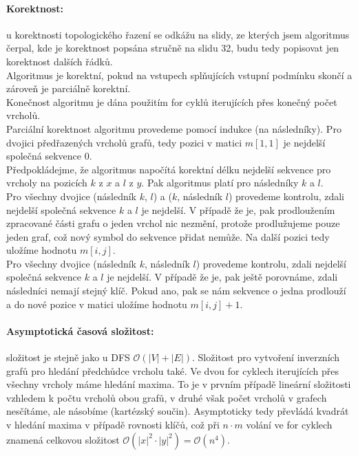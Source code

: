 \documentclass[12pt]{iv003}
\begin{document}
\paragraph{Korektnost:} u korektnosti topologického řazení se odkážu na slidy, ze kterých jsem algoritmus čerpal, kde je korektnost popsána stručně na slidu 32, budu tedy popisovat jen korektnost dalších řádků.\\
Algoritmus je korektní, pokud na vstupech splňujících vstupní podmínku skončí a zároveň je parciálně korektní.\\
Konečnost algoritmu je dána použitím for cyklů iterujících přes konečný počet vrcholů.\\
Parciální korektnost algoritmu provedeme pomocí indukce (na následníky). Pro dvojici předřazených vrcholů grafů, tedy pozici v matici $m[1,1]$ je nejdelší společná sekvence 0.\\
Předpokládejme, že algoritmus napočítá korektní délku nejdelší sekvence pro vrcholy na pozicích $k$ z $x$ a $l$ z $y$. Pak algoritmus platí pro následníky $k$ a $l$.\\
Pro všechny dvojice (následník $k$, $l$) a ($k$, následník $l$) provedeme kontrolu, zdali nejdelší společná sekvence $k$ a $l$ je nejdelší. V případě že je, pak prodloužením zpracované části grafu o jeden vrchol nic nezmění, protože prodlužujeme pouze jeden graf, což nový symbol do sekvence přidat nemůže. Na další pozici tedy uložíme hodnotu $m[i,j]$.\\
Pro všechny dvojice (následník $k$, následník $l$) provedeme kontrolu, zdali nejdelší společná sekvence $k$ a $l$ je nejdelší. V případě že je, pak ještě porovnáme, zdali následníci nemají stejný klíč. Pokud ano, pak se nám sekvence o jedna prodlouží a do nové pozice v matici uložíme hodnotu $m[i,j]+1$.

\paragraph{Asymptotická časová složitost:} složitost \fftopologicalSort je stejně jako u DFS $\mathcal{O}(|V|+|E|)$. Složitost pro vytvoření inverzních grafů pro hledání předchůdce vrcholu také. Ve dvou for cyklech iterujících přes všechny vrcholy máme hledání maxima. To je v prvním případě lineární složitosti vzhledem k počtu vrcholů obou grafů, v druhé však počet vrcholů v grafech nesčítáme, ale násobíme (kartézský součin). Asymptoticky tedy převládá kvadrát v hledání maxima v případě rovnosti klíčů, což při $n \cdot m$ volání ve for cyklech znamená celkovou složitost $\mathcal{O}(|x|^{2}\cdot|y|^{2}) = \mathcal{O}(n^{4})$.
\end{document}
